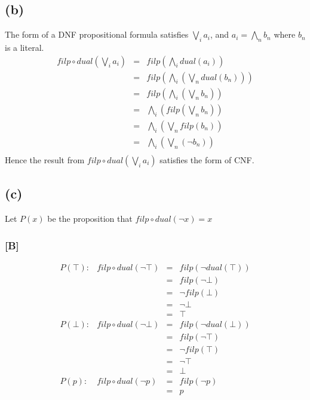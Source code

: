 \documentclass{article} %
\begin{document}
\subsection*{(b)}
The form of a DNF propositional formula satisfies $\underset{i}{\bigvee} a_i$, and $a_i = \underset{n}{\bigwedge} b_n$ where $b_n$ is a literal.\\
\[\begin{array}{rll}
    filp \circ dual(\underset{i}{\bigvee} a_i)  &=& filp(\underset{i}{\bigwedge} dual(a_i))\\
                                                &=& filp(\underset{i}{\bigwedge} (\underset{n}{\bigvee}dual(b_n)))\\
                                                &=& filp(\underset{i}{\bigwedge} (\underset{n}{\bigvee}b_n))\\
                                                &=& \underset{i}{\bigwedge} (filp(\underset{n}{\bigvee}b_n))\\
                                                &=& \underset{i}{\bigwedge} (\underset{n}{\bigvee}filp(b_n))\\
                                                &=& \underset{i}{\bigwedge} (\underset{n}{\bigvee}(\neg b_n))\\
\end{array}\]
Hence the result from $filp \circ dual(\underset{i}{\bigvee} a_i)$ satisfies the form of CNF.\\
\subsection*{(c)}
Let $P(x)$ be the proposition that $filp \circ dual(\neg x) = x$\\
\subsubsection*{[B]}
\[\begin{array}{lrll}
    P(\top):&filp\circ dual(\neg \top)   &=& filp(\neg dual(\top))\\
                                        &&=& filp(\neg \bot)\\
                                        &&=& \neg filp(\bot)\\
                                        &&=& \neg \bot\\
                                        &&=& \top\\
    P(\bot):&filp\circ dual(\neg \bot)   &=& filp(\neg dual(\bot))\\
                                        &&=& filp(\neg \top)\\
                                        &&=& \neg filp(\top)\\
                                        &&=& \neg \top\\
                                        &&=& \bot\\
    P(p):   &filp\circ dual(\neg p)      &=& filp(\neg p)\\
                                        &&=& p\\
\end{array}\]
\end{document}
